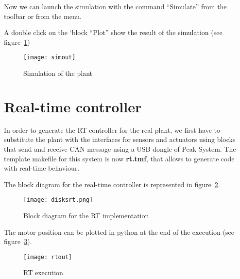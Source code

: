 Now we can launch the simulation with the command ``Simulate'' from the toolbar 
or from the menu.

A double click on the `block ``Plot'' show the result of the simulation (see 
figure~\ref{F22})

\begin{figure}[htbp]	%
\centering
\texttt{[image: simout]}
\caption{Simulation of the plant}
\label{F22}
\end{figure}

\section{Real-time controller}

In order to generate the RT controller for the real plant, we first have to 
substitute the plant with the interfaces for sensors and actuators using blocks 
that send and receive CAN message using a USB dongle of Peak System. The 
template makefile for this system is now \textbf{rt.tmf}, that allows to 
generate code with real-time behaviour.

The block diagram for the real-time controller is represented in 
figure~\ref{F23}.

\begin{figure}[htbp]	%
\centering
\texttt{[image: disksrt.png]}
\caption{Block diagram for the RT implementation}
\label{F23}
\end{figure}

The motor position can be plotted in python at the end of the execution (see 
figure~\ref{F24}).

\begin{figure}[htbp]	%
\centering
\texttt{[image: rtout]}
\caption{RT execution}
\label{F24}
\end{figure}
